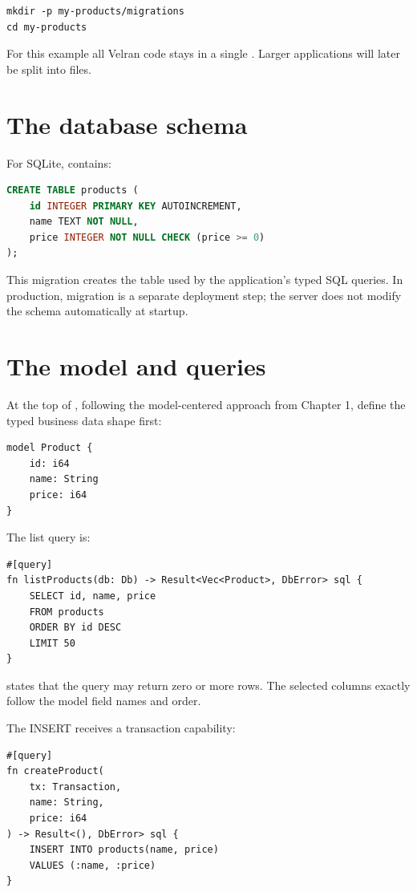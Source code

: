 \begin{lstlisting}
mkdir -p my-products/migrations
cd my-products
\end{lstlisting}

For this example all Velran code stays in a single . Larger applications will later be split into  files.

\section{The database schema}

For SQLite,  contains:

\begin{lstlisting}[language=SQL]
CREATE TABLE products (
    id INTEGER PRIMARY KEY AUTOINCREMENT,
    name TEXT NOT NULL,
    price INTEGER NOT NULL CHECK (price >= 0)
);
\end{lstlisting}

This migration creates the table used by the application's typed SQL queries. In production, migration is a separate deployment step; the server does not modify the schema automatically at startup.

\section{The model and queries}

At the top of , following the model-centered approach from Chapter 1, define the typed business data shape first:

\begin{lstlisting}[language=Velran]
model Product {
    id: i64
    name: String
    price: i64
}
\end{lstlisting}

The list query is:

\begin{lstlisting}[language=Velran]
#[query]
fn listProducts(db: Db) -> Result<Vec<Product>, DbError> sql {
    SELECT id, name, price
    FROM products
    ORDER BY id DESC
    LIMIT 50
}
\end{lstlisting}

 states that the query may return zero or more  rows. The selected columns exactly follow the model field names and order.

The INSERT receives a transaction capability:

\begin{lstlisting}[language=Velran]
#[query]
fn createProduct(
    tx: Transaction,
    name: String,
    price: i64
) -> Result<(), DbError> sql {
    INSERT INTO products(name, price)
    VALUES (:name, :price)
}
\end{lstlisting}

